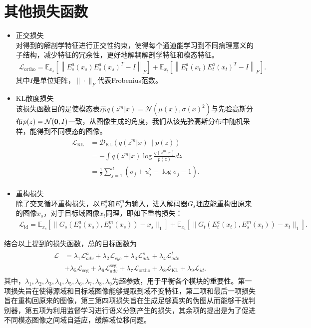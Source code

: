 \section{其他损失函数}
\begin{itemize}
    \item 正交损失\\对得到的解剖学特征进行正交性约束，使得每个通道能学习到不同病理意义的子结构，减少特征的冗余性，更好地解耦解剖学特征和模态特征。
    \begin{align}
        \mathcal{L}_{\text {ortho}}=\mathbb{E}_{x_s}\left[\left\|E^a_s(x_s) E^a_s(x_s)^T-I\right\|_{F}\right] + \mathbb{E}_{x_t}\left[\left\|E^a_t(x_t) E^a_t(x_t)^T-I\right\|_{F}\right].
    \end{align}
    其中$I$是单位矩阵，$\|\cdot \|_F$代表Frobenius范数。
    \item KL散度损失\\该损失函数目的是使模态表示$q(z^m|x)=\mathcal{N}(\mu(x), \sigma(x)^2)$与先验高斯分布$p(z)=\mathcal{N}(\bold{0},I)$一致，从图像生成的角度，我们从该先验高斯分布中随机采样，能得到不同模态的图像。
    \begin{align}
        \begin{aligned}\mathcal{L}_{\mathrm{KL}}&=\mathcal{D}_{\mathrm{KL}}(q(z^m|x)\|p(z))\\&=-\int{q(z^m|x)\log\frac{q(z^m|x)}{p(z)}dz}\\&=\frac{1}{2}\sum_{j=1}^d(\sigma_j+u_j^2-\log \sigma_j-1).\end{aligned}
    \end{align}
    \item 重构损失\\除了交叉循环重构损失，以$E_s^a$和$E_s^m$为输入，进入解码器$G_s$理应能重构出原来的图像$x_s$，对于目标域图像$x_t$同理，即如下重构损失：
    \begin{align}
        \mathcal{L}_{\mathrm{id}} = \mathbb{E}_{x_s}[\|G_s(E_s^a(x_s),E_s^m(x_s))-x_s\|_1] + \mathbb{E}_{x_t}[\|G_t(E_t^a(x_t),E_s^m(x_t))-x_t\|_1].
    \end{align}
\end{itemize}
结合以上提到的损失函数，总的目标函数为
\begin{align}
    \begin{aligned}
    \mathcal{L} &= \lambda_1\mathcal{L}_{adv}^a +\lambda_2\mathcal{L}_{cyc} +\lambda_3\mathcal{L}_{adv}^s +\lambda_4\mathcal{L}_{adv}^t \\
    &+\lambda_5\mathcal{L}_{\mathrm{seg}} +\lambda_6\mathcal{L}_{adv}^{\mathrm{seg}} +\lambda_7\mathcal{L}_{\mathrm{ortho}} +\lambda_8\mathcal{L}_{\mathcal{\mathrm{KL}}} + \lambda_9\mathcal{L}_{id}.
    \end{aligned}
    \label{eq:loss}
\end{align}
其中，$\lambda_1,\lambda_2,\lambda_3,\lambda_4,\lambda_5,\lambda_6,\lambda_7,\lambda_8,\lambda_9$为超参数，用于平衡各个模块的重要性。第一项损失旨在使得源域和目标域图像能够提取到域不变特征，第二项和最后一项损失旨在重构回原来的图像，第三第四项损失旨在生成足够真实的伪图从而能够干扰判别器，第五项为利用监督学习进行语义分割产生的损失，其余项的提出是为了促进不同模态图像之间域自适应，缓解域位移问题。

